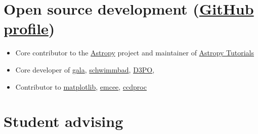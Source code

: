 \documentclass[12pt,letterpaper]{article}
\begin{document}
\begin{itemize}

\end{itemize}


\section*{Open source development (\href{https://github.com/adrn}{GitHub profile})}

\begin{itemize}

	\item Core contributor to the \href{http://www.astropy.org/}{Astropy} project and maintainer of \href{http://tutorials.astropy.org/}{Astropy Tutorials}
	\item Core developer of \href{http://gala.adrian.pw}{gala}, \href{https://github.com/adrn/schwimmbad}{schwimmbad}, \href{http://d3po.org}{D3PO},
	\item Contributor to \href{http://matplotlib.org/}{matplotlib}, \href{http://dan.iel.fm/emcee/current/}{emcee}, \href{https://github.com/astropy/ccdproc}{ccdproc}

\end{itemize}


\section*{Student advising}
\end{document}
